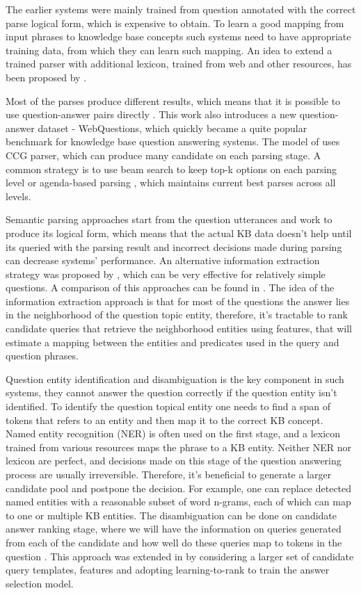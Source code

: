 The earlier systems were mainly trained from question annotated with the correct parse logical form, which is expensive to obtain.
To learn a good mapping from input phrases to knowledge base concepts such systems need to have appropriate training data, from which they can learn such mapping.
An idea to extend a trained parser with additional lexicon, trained from web and other resources, has been proposed by \cite{CaiY13}.

Most of the parses produce different results, which means that it is possible to use question-answer pairs directly \cite{BerantCFL13:sempre}.
This work also introduces a new question-answer dataset - WebQuestions, which quickly became a quite popular benchmark for knowledge base question answering systems.
The model of \cite{BerantCFL13:sempre} uses CCG parser, which can produce many candidate on each parsing stage.
A common strategy is to use beam search to keep top-k options on each parsing level or agenda-based parsing \cite{berant2015imitation}, which maintains current best parses across all levels.

Semantic parsing approaches start from the question utterances and work to produce its logical form, which means that the actual KB data doesn't help until its queried with the parsing result and incorrect decisions made during parsing can decrease systems' performance.
An alternative information extraction strategy was proposed by \cite{YaoD14}, which can be very effective for relatively simple questions.
A comparison of this approaches can be found in \cite{yao2014freebase}.
The idea of the information extraction approach is that for most of the questions the answer lies in the neighborhood of the question topic entity, therefore, it's tractable to rank candidate queries that retrieve the neighborhood entities using features, that will estimate a mapping between the entities and predicates used in the query and question phrases.

Question entity identification and disambiguation is the key component in such systems, they cannot answer the question correctly if the question entity isn't identified.
To identify the question topical entity one needs to find a span of tokens that refers to an entity and then map it to the correct KB concept.
Named entity recognition (NER) is often used on the first stage, and a lexicon trained from various resources maps the phrase to a KB entity.
Neither NER nor lexicon are perfect, and decisions made on this stage of the question answering process are usually irreversible.
Therefore, it's beneficial to generate a larger candidate pool and postpone the decision.
For example, one can replace detected named entities with a reasonable subset of word n-grams, each of which can map to one or multiple KB entities.
The disambiguation can be done on candidate answer ranking stage, where we will have the information on queries generated from each of the candidate and how well do these queries map to tokens in the question \cite{yao-scratch-qa-naacl2015}.
This approach was extended in \cite{bastmore:cikm:2015:aquu} by considering a larger set of candidate query templates, features and adopting learning-to-rank to train the answer selection model.


